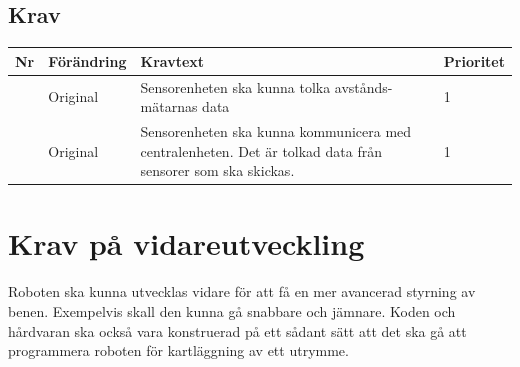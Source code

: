 \documentclass[a4paper,titlepage,12pt]{article}
\newcounter{reqNr}
\newcommand{\nextReqNr}{\stepcounter{reqNr}\arabic{reqNr}}
\begin{document}
	\subsection{Krav}
	\begin{table}[h]
		\label{tab:label}
		\begin{tabularx}{\textwidth}{|c|l|X|l|}
			\hline
			\textbf{Nr} & \textbf{Förändring} & \textbf{Kravtext} & \textbf{Prioritet} 
				\\ \hline

			\nextReqNr & Original & Sensorenheten ska kunna tolka avstånds- mätarnas data & 1
				\\ \hline

			\nextReqNr & Original & Sensorenheten ska kunna kommunicera med 
				centralenheten. Det är tolkad data från sensorer som ska skickas.& 1
				\\ \hline

		\end{tabularx}
	\end{table}



	\section{Krav på vidareutveckling}
	Roboten ska kunna utvecklas vidare för att få en mer avancerad styrning av benen. 
	Exempelvis skall den kunna gå snabbare och jämnare. Koden och hårdvaran ska också vara
	konstruerad på ett sådant sätt att det ska gå att programmera roboten för
	kartläggning av ett utrymme.
\end{document}
